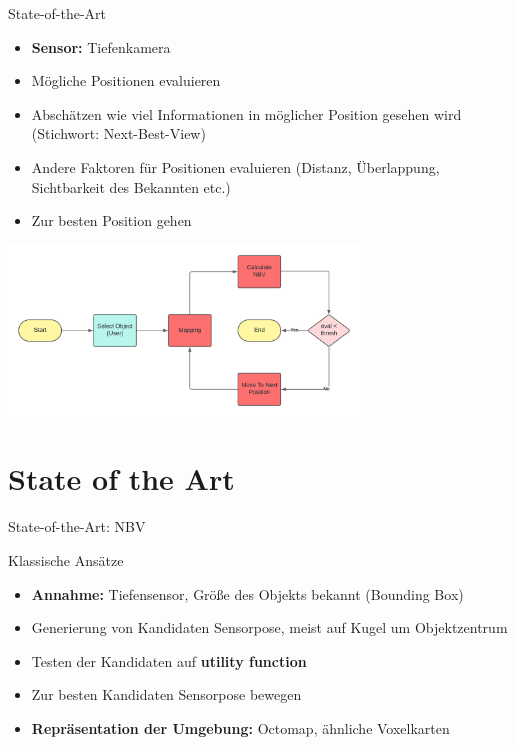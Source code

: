 \documentclass{beamer}
\begin{document}
\begin{frame}{State-of-the-Art}
	\begin{block}{}
		\begin{itemize}
			\item \textbf{Sensor:} Tiefenkamera
			\item Mögliche Positionen evaluieren
			\item Abschätzen wie viel Informationen in möglicher Position gesehen wird (Stichwort: Next-Best-View)
			\item Andere Faktoren für Positionen evaluieren (Distanz, Überlappung, Sichtbarkeit des Bekannten etc.)
			\item Zur besten Position gehen
		\end{itemize}
	\end{block}
	\begin{center}
		\includegraphics[width=0.7\textwidth]{Graphics/flow_chart.png}
	\end{center}
\end{frame}

\section{State of the Art}
\begin{frame}{State-of-the-Art: NBV}
	\begin{block}{Klassische Ansätze}
		\begin{itemize}
			\item \textbf{Annahme:} Tiefensensor, Größe des Objekts bekannt (Bounding Box)
			\item Generierung von Kandidaten Sensorpose, meist auf Kugel um Objektzentrum
			\item Testen der Kandidaten auf \textbf{utility function}
			\item Zur besten Kandidaten Sensorpose bewegen
			\item \textbf{Repräsentation der Umgebung:} Octomap, ähnliche Voxelkarten
		\end{itemize}
		\cite{zeng_view_2020}
	\end{block}
\end{frame}
\end{document}
